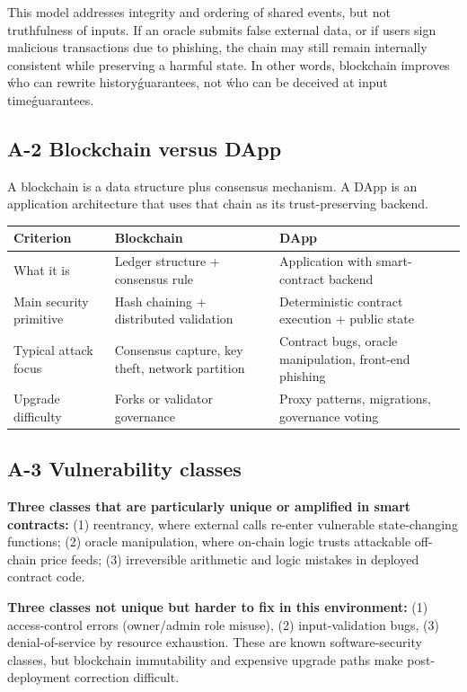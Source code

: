 \documentclass[10pt,a4paper]{article}
\begin{document}
This model addresses integrity and ordering of shared events, but not truthfulness of inputs. If an oracle submits false external data, or if users sign malicious transactions due to phishing, the chain may still remain internally consistent while preserving a harmful state. In other words, blockchain improves \'who can rewrite history\' guarantees, not \'who can be deceived at input time\' guarantees.

\subsection*{A-2 Blockchain versus DApp}
A blockchain is a data structure plus consensus mechanism. A DApp is an application architecture that uses that chain as its trust-preserving backend.

\begin{longtable}{p{3.2cm}p{5.4cm}p{6.2cm}}
\toprule
Criterion & Blockchain & DApp \\
\midrule
What it is & Ledger structure + consensus rule & Application with smart-contract backend \\
Main security primitive & Hash chaining + distributed validation & Deterministic contract execution + public state \\
Typical attack focus & Consensus capture, key theft, network partition & Contract bugs, oracle manipulation, front-end phishing \\
Upgrade difficulty & Forks or validator governance & Proxy patterns, migrations, governance voting \\
\bottomrule
\end{longtable}

\subsection*{A-3 Vulnerability classes}
\textbf{Three classes that are particularly unique or amplified in smart contracts:}
(1) reentrancy, where external calls re-enter vulnerable state-changing functions;
(2) oracle manipulation, where on-chain logic trusts attackable off-chain price feeds;
(3) irreversible arithmetic and logic mistakes in deployed contract code.

\textbf{Three classes not unique but harder to fix in this environment:}
(1) access-control errors (owner/admin role misuse),
(2) input-validation bugs,
(3) denial-of-service by resource exhaustion. These are known software-security classes, but blockchain immutability and expensive upgrade paths make post-deployment correction difficult.
\end{document}
